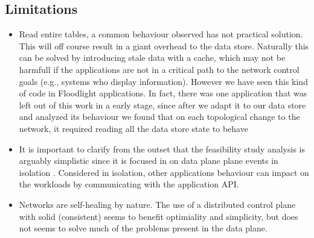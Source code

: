 \subsection{Limitations}
\begin{itemize}
\item Read entire tables, a common behaviour observed has not practical solution.  This will off course result in a giant overhead to the data store. Naturally this can be solved by introducing stale data with a cache, which may not be harmfull if the applications are not in a critical path to the network control goals (e.g., systems who display information). However we have seen this kind of code in Floodlight applications. In fact, there was one application that was left out of this work in a early stage, since after we adapt it to our data store and analyzed its behaviour we found that on each topological change to the network, it required reading all the data store state to behave 
\item It is important to clarify from the outset that the feasibility study analysis is arguably simplistic since it is focused in on data plane plane events in isolation . Considered in isolation,
other applications behaviour can impact on the workloads  by communicating with the application API.

\item Networks are self-healing by nature. The use of a distributed control plane with solid (consistent)  seems to benefit optimiality and simplicity, but does not seems to solve much of the problems present in the data plane. 
\end{itemize}


